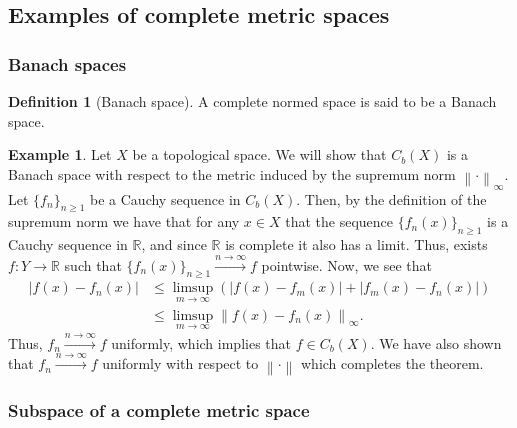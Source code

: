 \documentclass[11pt,a4paper]{article}
\theoremstyle{definition}
\newtheorem{definition}{Definition}[section]
\newtheorem{example}{Example}[section]
\theoremstyle{plain}
\newcommand{\R}{\mathbb{R}}
\newcommand{\abs}[1]{\left\lvert #1\right\rvert}
\newcommand{\norm}[1]{\left\lVert #1\right\rVert}
\begin{document}
  \subsection{Examples of complete metric spaces}

  \subsubsection{Banach spaces}

  \begin{definition}[Banach space]
    A complete normed space is said to be a Banach space.
  \end{definition}

  \begin{example}
    Let $X$ be a topological space. We will show that $C_b(X)$ is a Banach
    space with respect to the metric induced by the supremum norm 
    $\norm{\cdot}_{\infty}$. Let $\{f_n\}_{n \geq 1}$ be a Cauchy sequence
    in $C_b(X)$. Then, by the definition of the supremum norm we have that
    for any $x \in X$ that the sequence $\{f_n(x)\}_{n \geq 1}$ is a Cauchy
    sequence in $\R$, and since $\R$ is complete it also has a limit.
    Thus, exists $f \colon Y \to \R$ such that 
    $\{f_n(x)\}_{n \geq 1} \xrightarrow{n \to \infty} f$ pointwise.
    Now, we see that
    \begin{align*}
      \abs{f(x) - f_n(x)} &\le
      \limsup_{m \to \infty}(\abs{f(x) - f_m(x)} + \abs{f_m(x) - f_n(x)}) \\
      &\le \limsup_{m \to \infty} \norm{f(x) - f_n(x)}_{\infty}.
    \end{align*}
    Thus, $f_n \xrightarrow{n \to \infty} f$ uniformly,
    which implies that $f \in C_b(X)$. We have also shown that
    $f_n \xrightarrow{n \to \infty} f$ uniformly with respect to $\norm{\cdot}$
    which completes the theorem.
  \end{example}

  \subsubsection{Subspace of a complete metric space}
\end{document}
